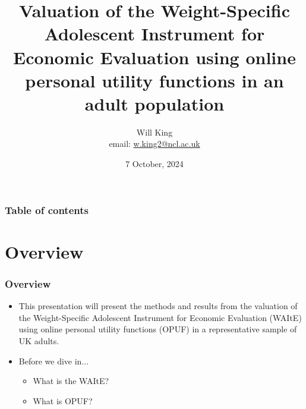 \documentclass[t,compress,9pt,aspectratio=169]{beamer}
\title[NIHR ARC North East and North Cumbria]{\textbf{Valuation of the Weight-Specific Adolescent Instrument for Economic Evaluation using online personal utility functions in an adult population}}
\subtitle{}
\author[King, Will]{Will King \\ \small email: \href{mailto:w.king2@ncl.ac.uk}{w.king2@ncl.ac.uk}}
\institute{NIHR ARC North East and
North Cumbria, \\
Newcastle University}
\date[7 October]{7 October, 2024}
\begin{document}
\begin{frame}[plain]
\maketitle
\end{frame}



\begin{frame}
\tableofcontents
\frametitle{Table of contents}
\end{frame}


\section{Overview}
\begin{frame}[fragile]
\frametitle{Overview}
\begin{itemize}
  \item This presentation will present the methods and results from the valuation of the Weight-Specific Adolescent Instrument for Economic Evaluation (WAItE) using online personal utility functions (OPUF) in a representative sample of UK adults.
  \item Before we dive in...
  \begin{itemize}
      \item What is the WAItE?
      \item What is OPUF?
  \end{itemize}
\end{itemize}
\end{frame}

\end{document}
